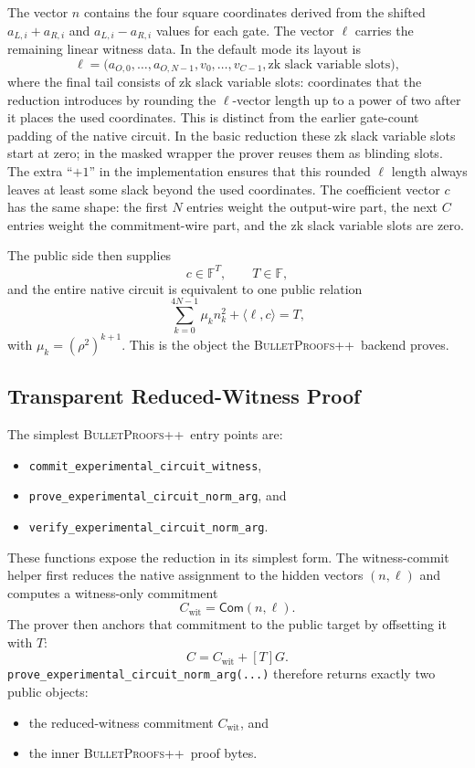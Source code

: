 \documentclass[11pt]{article}
\DeclareRobustCommand{\bppp}{{\normalfont\scshape BulletProofs++}}
\begin{document}
The vector $n$ contains the four square coordinates derived from the shifted
$a_{L,i}+a_{R,i}$ and $a_{L,i}-a_{R,i}$ values for each gate. The vector $\ell$ carries the
remaining linear witness data. In the default mode its layout is
\[
\ell =
\bigl(a_{O,0}, \ldots, a_{O,N-1}, v_0, \ldots, v_{C-1}, \text{zk slack variable slots}\bigr),
\]
where the final tail consists of zk slack variable slots: coordinates that the reduction introduces by rounding the $\ell$-vector
length up to a power of two after it places the used coordinates. This is distinct from the
earlier gate-count padding of the native circuit. In the basic reduction these zk slack variable
slots start at zero; in the masked wrapper the prover reuses them as blinding slots. The extra ``$+1$'' in the
implementation ensures that this rounded $\ell$ length always leaves at least some slack beyond the
used coordinates. The coefficient vector $c$ has the same shape: the first $N$ entries weight the
output-wire part, the next $C$ entries weight the commitment-wire part, and the zk slack variable slots are zero.

The public side then supplies
\[
c \in \mathbb{F}^{T}, \qquad T \in \mathbb{F},
\]
and the entire native circuit is equivalent to one public relation
\[
\sum_{k=0}^{4N-1} \mu_k n_k^2 + \langle \ell, c \rangle = T,
\]
with $\mu_k = (\rho^2)^{k+1}$. This is the object the \bppp\ backend proves.

\subsection{Transparent Reduced-Witness Proof}

The simplest \bppp\ entry points are:
\begin{itemize}[nosep]
  \item \texttt{commit\_experimental\_circuit\_witness},
  \item \texttt{prove\_experimental\_circuit\_norm\_arg}, and
  \item \texttt{verify\_experimental\_circuit\_norm\_arg}.
\end{itemize}

These functions expose the reduction in its simplest form.
The witness-commit helper first reduces the native assignment to the hidden vectors $(n,\ell)$ and
computes a witness-only commitment
\[
C_{\mathrm{wit}} = \mathsf{Com}(n,\ell).
\]
The prover then anchors that commitment to the public target by offsetting it with $T$:
\[
C = C_{\mathrm{wit}} + [T]G.
\]
\texttt{prove\_experimental\_circuit\_norm\_arg(...)} therefore returns exactly two public
objects:
\begin{itemize}[nosep]
  \item the reduced-witness commitment $C_{\mathrm{wit}}$, and
  \item the inner \bppp\ proof bytes.
\end{itemize}
\end{document}
